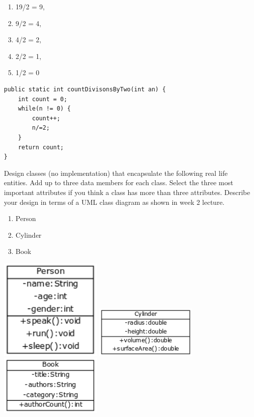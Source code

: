 \begin{questions}
\begin{enumerate}
\item 19/2 = 9, 
\item 9/2 = 4, 
\item 4/2 = 2, 
\item 2/2 = 1, 
\item 1/2 = 0
\end{enumerate}

\begin{solution}
\begin{lstlisting}
public static int countDivisonsByTwo(int an) {
	int count = 0;
	while(n != 0) {
		count++;
		n/=2;
	}
	return count;
}
\end{lstlisting}
\end{solution}

\newpage

\question Design classes (no implementation) that encapsulate the following real life entities. Add up to three data members for each class. Select the three most important attributes if you think a class has more than three attributes. Describe your design in terms of a UML class diagram as shown in week 2 lecture.

\begin{enumerate}
\item Person
\item Cylinder
\item Book
\end{enumerate}

\begin{solution}
\includegraphics[width=5cm]{Person.png}
\vskip 0.5cm
\includegraphics[width=5cm]{Cylinder.png}
\vskip 0.5cm
\includegraphics[width=5cm]{Book.png}
\vskip 0.5cm
\end{solution}


\end{questions}
